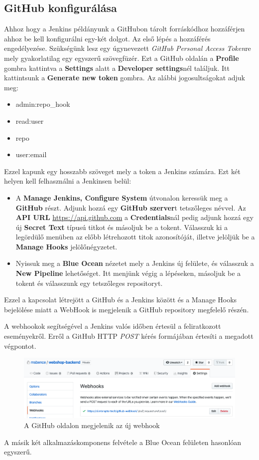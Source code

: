 \subsection{GitHub konfigurálása}
Ahhoz hogy a Jenkins példányunk a GitHubon tárolt forráskódhoz hozzáférjen ahhoz be kell konfigurálni egy-két dolgot. Az első lépés a hozzáférés engedélyezése.
Szükségünk lesz egy úgynevezett \textit{GitHub Personal Access Token}re mely gyakorlatilag egy egyszerű szövegfüzér. Ezt a GitHub oldalán a \textbf{Profile} gombra kattintva a \textbf{Settings} alatt a \textbf{Developer settings}nél találjuk. Itt kattintsunk a \textbf{Generate new token} gombra. Az alábbi jogosultságokat adjuk meg:
\begin{itemize}
    \item admin:repo\_hook
    \item read:user
    \item repo
    \item user:email
\end{itemize}
Ezzel kapunk egy hosszabb szöveget mely a token a Jenkins számára. Ezt két helyen kell felhasználni a Jenkinsen belül:
\begin{itemize}
    \item A \textbf{Manage Jenkins, Configure System} útvonalon keressük meg a \textbf{GitHub} részt. Adjunk hozzá egy \textbf{GitHub szerver}t tetszőleges névvel. Az \textbf{API URL} \url{https://api.github.com} a \textbf{Credentials}nál pedig adjunk hozzá egy új \textbf{Secret Text} típusú titkot és másoljuk be a tokent. Válasszuk ki a legördülő menüben az előbb létrehozott titok azonosítóját, illetve jelöljük be a \textbf{Manage Hooks} jelölőnégyzetet.
    \item Nyissuk meg a \textbf{Blue Ocean} nézetet mely a Jenkins új felülete, és válasszuk a \textbf{New Pipeline} lehetőséget. Itt menjünk végig a lépéseken, másoljuk be a tokent és válasszunk egy tetszőleges repositoryt.
\end{itemize}
Ezzel a kapcsolat létrejött a GitHub és a Jenkins között és a Manage Hooks bejelölése miatt a WebHook is megjelenik a GitHub repository megfelelő részén.

A webhookok segítségével a Jenkins valós időben értesül a feliratkozott eseményekről. Erről a GitHub HTTP \textit{POST} kérés formájában értesíti a megadott végpontot.
\begin{figure}[ht]
\centering
\includegraphics[width=150mm, keepaspectratio]{img/webhook.png}
\caption{A GitHub oldalon megjelenik az új webhook}
\end{figure}
\vskip 0.1in
A másik két alkalmazáskomponens felvétele a Blue Ocean felületen hasonlóan egyszerű.

